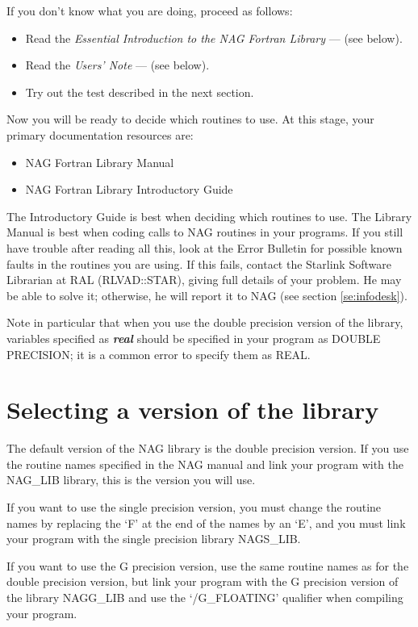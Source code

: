 If you don't know what you are doing, proceed as follows:
\begin{itemize}
\item Read the {\em Essential Introduction to the NAG Fortran Library} --- (see
 below).
\item Read the {\em Users' Note} --- (see below).
\item Try out the test described in the next section.
\end{itemize}

Now you will be ready to decide which routines to use. At this stage, your
primary documentation resources are:

\begin{itemize}
\item NAG Fortran Library Manual
\item NAG Fortran Library Introductory Guide
\end{itemize}

The Introductory Guide is best when deciding which routines to use. The Library
Manual is best when coding calls to NAG routines in your programs. If you still
have trouble after reading all this, look at the Error Bulletin for possible
known faults in the routines you are using. If this fails, contact the Starlink
Software Librarian at RAL (RLVAD::STAR), giving full details of your problem.
He may be able to solve it; otherwise, he will report it to NAG (see section
\ref{se:infodesk}).

Note in particular that when you use the double precision version of the
library, variables specified as {\em\bf real} should be specified in your
program as DOUBLE PRECISION; it is a common error to specify them as REAL.

\section{Selecting a version of the library}

The default version of the NAG library is the double precision version.
If you use the routine names specified in the NAG manual and link your program
with the NAG\_LIB library, this is the version you will use.

If you want to use the single precision version, you must change the routine
names by replacing the `F' at the end of the names by an `E', and
you must link your program with the single precision library NAGS\_LIB.

If you want to use the G precision version, use the same routine names as for
the double precision version, but link your program with the G
precision version of the library NAGG\_LIB and use the `/G\_FLOATING' qualifier
when compiling your program.

